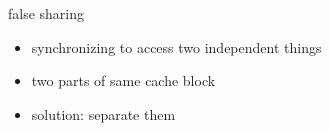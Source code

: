 \begin{frame}{false sharing}
\begin{itemize}
\item synchronizing to access two independent things
\vspace{.5cm}
\item two parts of same cache block
\item solution: separate them
\end{itemize}
\end{frame}
